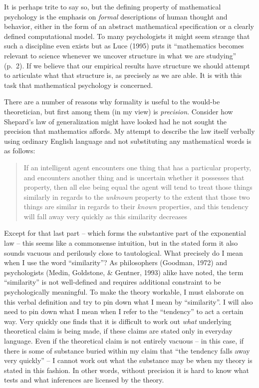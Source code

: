 \documentclass[
  english,
  doc]{apa6}
\begin{document}
\noindent
It is perhaps trite to say so, but the defining property of mathematical psychology is the emphasis on \emph{formal} descriptions of human thought and behavior, either in the form of an abstract mathematical specification or a clearly defined computational model. To many psychologists it might seem strange that such a discipline even exists but as Luce (1995) puts it \enquote{mathematics becomes relevant to science whenever we uncover structure in what we are studying} (p.~2). If we believe that our empirical results have structure we should attempt to articulate what that structure is, as precisely as we are able. It is with this task that mathematical psychology is concerned.

There are a number of reasons why formality is useful to the would-be theoretician, but first among them (in my view) is \emph{precision}. Consider how Shepard's law of generalization might have looked had he not sought the precision that mathematics affords. My attempt to describe the law itself verbally using ordinary English language and not substituting any mathematical words is as follows:

\begin{quote}
If an intelligent agent encounters one thing that has a particular property, and encounters another thing and is uncertain whether it possesses that property, then all else being equal the agent will tend to treat those things similarly in regards to the \emph{unknown} property to the extent that those two things are similar in regards to their \emph{known} properties, and this tendency will fall away very quickly as this similarity decreases
\end{quote}

\noindent
Except for that last part -- which forms the substantive part of the exponential law -- this seems like a commonsense intuition, but in the stated form it also sounds vacuous and perilously close to tautological. What precisely do I mean when I use the word \enquote{similarity}? As philosophers (Goodman, 1972) and psychologists (Medin, Goldstone, \& Gentner, 1993) alike have noted, the term \enquote{similarity} is not well-defined and requires additional constraint to be psychologically meaningful. To make the theory workable, I must elaborate on this verbal definition and try to pin down what I mean by \enquote{similarity}. I will also need to pin down what I mean when I refer to the \enquote{tendency} to act a certain way. Very quickly one finds that it is difficult to work out \emph{what} underlying theoretical claim is being made, if these claims are stated only in everyday language. Even if the theoretical claim is not entirely vacuous -- in this case, if there is some of substance buried within my claim that \enquote{the tendency falls away very quickly} -- I cannot work out what the substance may be when my theory is stated in this fashion. In other words, without precision it is hard to know what tests and what inferences are licensed by the theory.
\end{document}

